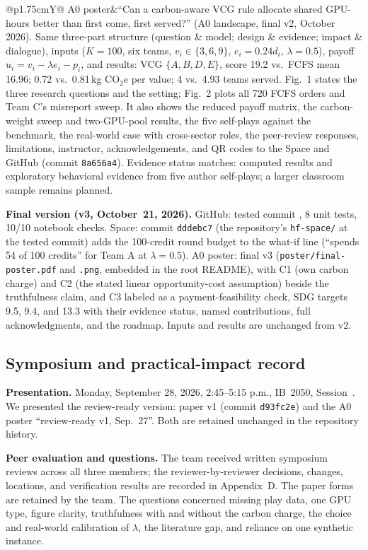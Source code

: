 {\begin{tabularx}{\columnwidth}{@{}p{1.75cm}Y@{}}
A0 poster&``Can a carbon-aware VCG rule allocate shared GPU-hours better than first come, first served?'' (A0 landscape, final v2, October 2026). Same three-part structure (question \& model; design \& evidence; impact \& dialogue), inputs ($K=100$, six teams, $v_i\in\{3,6,9\}$, $e_i=0.24d_i$, $\lambda=0.5$), payoff $u_i=v_i-\lambda e_i-p_i$, and results: VCG $\{A,B,D,E\}$, score 19.2 vs.\ FCFS mean 16.96; 0.72 vs.\ 0.81\,kg CO$_2$e per value; 4 vs.\ 4.93 teams served. Fig.~1 states the three research questions and the setting; Fig.~2 plots all 720 FCFS orders and Team C's misreport sweep. It also shows the reduced payoff matrix, the carbon-weight sweep and two-GPU-pool results, the five self-plays against the benchmark, the real-world case with cross-sector roles, the peer-review responses, limitations, instructor, acknowledgements, and QR codes to the Space and GitHub (commit \texttt{8a656a4}). Evidence status matches: computed results and exploratory behavioral evidence from five author self-plays; a larger classroom sample remains planned.\\\bottomrule
\end{tabularx}}

\textbf{Final version (v3, October~21, 2026).} GitHub: tested commit \texttt{\TestedCommit}, 8 unit tests, 10/10 notebook checks. Space: commit \texttt{dddebc7} (the repository's \texttt{hf-space/} at the tested commit) adds the 100-credit round budget to the what-if line (``spends 54 of 100 credits'' for Team A at $\lambda=0.5$). A0 poster: final v3 (\texttt{poster/final-poster.pdf} and \texttt{.png}, embedded in the root README), with C1 (own carbon charge) and C2 (the stated linear opportunity-cost assumption) beside the truthfulness claim, and C3 labeled as a payment-feasibility check, SDG targets 9.5, 9.4, and 13.3 with their evidence status, named contributions, full acknowledgments, and the roadmap. Inputs and results are unchanged from v2.

\subsection{Symposium and practical-impact record}

\textbf{Presentation.} Monday, September 28, 2026, 2:45--5:15 p.m., IB~2050, Session~\SymposiumSession. We presented the review-ready version: paper v1 (commit \texttt{d93fc2e}) and the A0 poster ``review-ready v1, Sep.~27''. Both are retained unchanged in the repository history.

\textbf{Peer evaluation and questions.} The team received written symposium reviews across all three members; the reviewer-by-reviewer decisions, changes, locations, and verification results are recorded in Appendix~D. The paper forms are retained by the team. The questions concerned missing play data, one GPU type, figure clarity, truthfulness with and without the carbon charge, the choice and real-world calibration of $\lambda$, the literature gap, and reliance on one synthetic instance.

